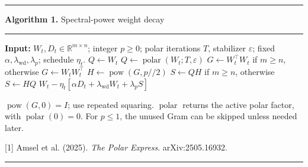 \documentclass[11pt,border=10pt]{standalone}
\newcommand{\Polar}{\operatorname{polar}}
\newcommand{\Pow}{\operatorname{pow}}
\begin{document}
\begin{minipage}{6.55in}
\hrule\vspace{5pt}
\textbf{Algorithm 1.} Spectral-power weight decay
\par\vspace{5pt}\hrule\vspace{8pt}
\begin{algorithmic}[1]
\Statex \textbf{Input:} $W_t,D_t\in\mathbb R^{m\times n}$; integer $p\ge0$; polar iterations $T$, stabilizer $\varepsilon$;
\Statex \hspace{1.1em}fixed $\alpha,\lambda_{\mathrm{wd}},\lambda_p$; schedule $\eta_t$.
\Statex
\State $Q\gets W_t$
    \State $Q\gets\Polar(W_t;T,\varepsilon)$ 
\EndIf
\State $G\gets W_t^{\top}W_t$ if $m\ge n$, otherwise $G\gets W_tW_t^{\top}$
\State $H\gets\Pow(G,p\mathbin{//}2)$ 
\State $S\gets QH$ if $m\ge n$, otherwise $S\gets HQ$
\State \Return $W_t-\eta_t[\alpha D_t+\lambda_{\mathrm{wd}}W_t+\lambda_p S]$
\end{algorithmic}
\vspace{6pt}
\small
$\Pow(G,0)=I$; use repeated squaring. $\Polar$ returns the active polar factor,
with $\Polar(0)=0$. For $p\le1$, the unused Gram can be skipped unless needed later.
\par\vspace{5pt}
[1] Amsel et al. (2025). \textit{The Polar Express}. arXiv:2505.16932.
\par\vspace{8pt}\hrule
\end{minipage}
\end{document}
